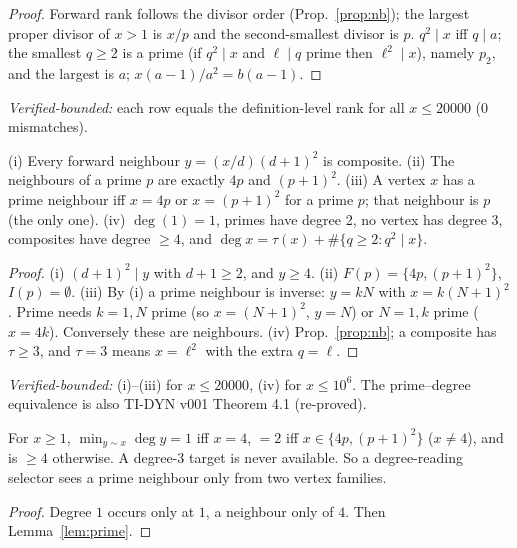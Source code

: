 \documentclass[11pt]{article}
\theoremstyle{remark}\newtheorem{remark}[theorem]{Remark}
\begin{document}
\begin{proof}Forward rank follows the divisor order (Prop.~\ref{prop:nb}); the largest proper divisor of $x>1$ is $x/p$ and the second-smallest divisor is $p$. $q^2\mid x$ iff $q\mid a$; the smallest $q\ge2$ is a prime (if $q^2\mid x$ and $\ell\mid q$ prime then $\ell^2\mid x$), namely $p_2$, and the largest is $a$; $x(a-1)/a^2=b(a-1)$.\end{proof}
\textit{Verified-bounded:} each row equals the definition-level rank for all $x\le20000$ (0 mismatches).

\begin{lemma}\label{lem:prime}
(i) Every forward neighbour $y=(x/d)(d+1)^2$ is composite. (ii) The neighbours of a prime $p$ are exactly $4p$ and $(p+1)^2$. (iii) A vertex $x$ has a prime neighbour iff $x=4p$ or $x=(p+1)^2$ for a prime $p$; that neighbour is $p$ (the only one). (iv) $\deg(1)=1$, primes have degree 2, no vertex has degree 3, composites have degree $\ge4$, and $\deg x=\tau(x)+\#\{q\ge2:q^2\mid x\}$.
\end{lemma}
\begin{proof}(i) $(d+1)^2\mid y$ with $d+1\ge2$, and $y\ge4$. (ii) $F(p)=\{4p,(p+1)^2\}$, $I(p)=\emptyset$. (iii) By (i) a prime neighbour is inverse: $y=kN$ with $x=k(N+1)^2$. Prime needs $k=1,N$ prime (so $x=(N+1)^2$, $y=N$) or $N=1,k$ prime ($x=4k$). Conversely these are neighbours. (iv) Prop.~\ref{prop:nb}; a composite has $\tau\ge3$, and $\tau=3$ means $x=\ell^2$ with the extra $q=\ell$.\end{proof}
\textit{Verified-bounded:} (i)--(iii) for $x\le20000$, (iv) for $x\le10^6$. The prime--degree equivalence is also TI-DYN v001 Theorem 4.1 (re-proved).
\begin{corollary}\label{cor:dm}
For $x\ge1$, $\min_{y\sim x}\deg y=1$ iff $x=4$, $=2$ iff $x\in\{4p,(p+1)^2\}$ ($x\ne4$), and is $\ge4$ otherwise. A degree-3 target is never available. So a degree-reading selector sees a prime neighbour only from two vertex families.
\end{corollary}
\begin{proof}Degree $1$ occurs only at $1$, a neighbour only of $4$. Then Lemma~\ref{lem:prime}.\end{proof}
\end{document}
